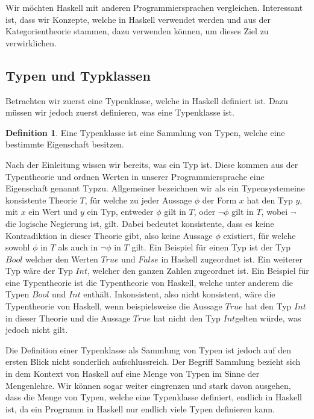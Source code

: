 \documentclass{hhuarticle}
\theoremstyle{definition}
\newtheorem{definition}{Definition}[section]
\theoremstyle{theorem}
\begin{document}
  Wir möchten Haskell mit anderen Programmiersprachen vergleichen.
  Interessant ist, dass wir Konzepte, welche in Haskell verwendet werden
  und aus der Kategorientheorie stammen, dazu verwenden können, um dieses
  Ziel zu verwirklichen.

  \subsection{Typen und Typklassen}

  Betrachten wir zuerst eine Typenklasse, welche in Haskell definiert ist.
  Dazu müssen wir jedoch zuerst definieren, was eine Typenklasse ist.

  \begin{definition}
    Eine Typenklasse ist eine Sammlung von Typen, welche eine bestimmte
    Eigenschaft besitzen.
  \end{definition}

  Nach der Einleitung wissen wir bereits, was ein Typ ist. Diese kommen
  aus der Typentheorie und ordnen Werten in unserer Programmiersprache
  eine Eigenschaft genannt \glqq Typ\grqq  zu. Allgemeiner bezeichnen wir als
  ein \glqq Typensystem\grqq  eine konsistente Theorie $T$, für welche zu jeder Aussage $\phi$
  der Form \glqq $x$ hat den Typ $y$\grqq , mit $x$ ein Wert und $y$ ein Typ,
  entweder $\phi$ gilt in $T$, oder $\neg \phi$ gilt in $T$, wobei \glqq $\neg$\grqq 
  die logische Negierung ist, gilt. Dabei bedeutet \glqq konsistente\grqq , dass
  es keine Kontradiktion in dieser Theorie gibt, also keine Aussage $\phi$
  existiert, für welche sowohl $\phi$ in $T$ als auch in $\neg \phi$ in $T$ gilt.
  Ein Beispiel für einen Typ ist der Typ $Bool$ welcher
  den Werten $True$ und $False$ in Haskell zugeordnet ist. Ein weiterer Typ wäre
  der Typ $Int$, welcher den ganzen Zahlen zugeordnet ist.
  Ein Beispiel für eine Typentheorie ist die Typentheorie von Haskell,
  welche unter anderem die Typen $Bool$ und $Int$ enthält. Inkonsistent,
  also nicht konsistent, wäre die Typentheorie von Haskell, wenn
  beispielsweise die Aussage \glqq $True$ hat den Typ $Int$\grqq  in dieser Theorie
  und die Aussage \glqq $True$ hat nicht den Typ $Int$\grqq  gelten würde, was
  jedoch nicht gilt.

  Die Definition einer Typenklasse als Sammlung von Typen ist jedoch auf
  den ersten Blick nicht sonderlich aufschlussreich. Der Begriff \glqq Sammlung\grqq 
  bezieht sich in dem Kontext von Haskell auf eine Menge von Typen im
  Sinne der Mengenlehre. Wir können sogar weiter eingrenzen und stark davon
  ausgehen, dass die Menge von Typen, welche eine Typenklasse definiert,
  endlich in Haskell ist, da ein Programm in Haskell nur endlich viele
  Typen definieren kann.
\end{document}
